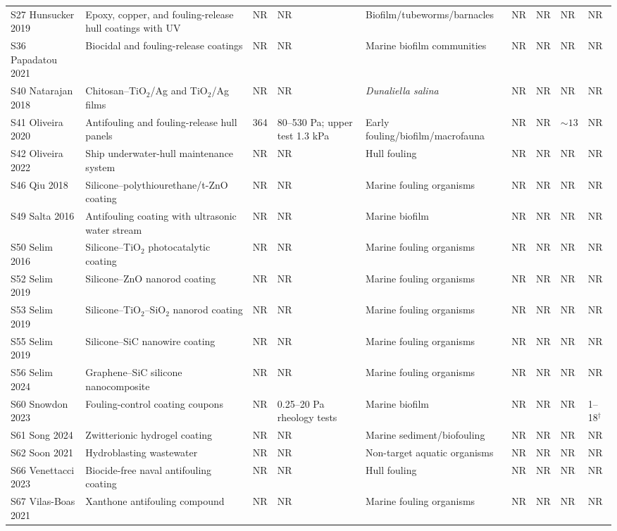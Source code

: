 \begin{table}[t]
{\begin{tabular}{l l l l l l l l l}
S27 Hunsucker 2019 & Epoxy, copper, and fouling-release hull coatings with UV & NR & NR & Biofilm/tubeworms/barnacles & NR & NR & NR & NR \\
S36 Papadatou 2021 & Biocidal and fouling-release coatings & NR & NR & Marine biofilm communities & NR & NR & NR & NR \\
S40 Natarajan 2018 & Chitosan--TiO$_2$/Ag and TiO$_2$/Ag films & NR & NR & \textit{Dunaliella salina} & NR & NR & NR & NR \\
S41 Oliveira 2020 & Antifouling and fouling-release hull panels & 364 & 80--530 Pa; upper test 1.3 kPa & Early fouling/biofilm/macrofauna & NR & NR & $\sim13$ & NR \\
S42 Oliveira 2022 & Ship underwater-hull maintenance system & NR & NR & Hull fouling & NR & NR & NR & NR \\
S46 Qiu 2018 & Silicone--polythiourethane/t-ZnO coating & NR & NR & Marine fouling organisms & NR & NR & NR & NR \\
S49 Salta 2016 & Antifouling coating with ultrasonic water stream & NR & NR & Marine biofilm & NR & NR & NR & NR \\
S50 Selim 2016 & Silicone--TiO$_2$ photocatalytic coating & NR & NR & Marine fouling organisms & NR & NR & NR & NR \\
S52 Selim 2019 & Silicone--ZnO nanorod coating & NR & NR & Marine fouling organisms & NR & NR & NR & NR \\
S53 Selim 2019 & Silicone--TiO$_2$--SiO$_2$ nanorod coating & NR & NR & Marine fouling organisms & NR & NR & NR & NR \\
S55 Selim 2019 & Silicone--SiC nanowire coating & NR & NR & Marine fouling organisms & NR & NR & NR & NR \\
S56 Selim 2024 & Graphene--SiC silicone nanocomposite & NR & NR & Marine fouling organisms & NR & NR & NR & NR \\
S60 Snowdon 2023 & Fouling-control coating coupons & NR & 0.25--20 Pa rheology tests & Marine biofilm & NR & NR & NR & 1--18$^\dagger$ \\
S61 Song 2024 & Zwitterionic hydrogel coating & NR & NR & Marine sediment/biofouling & NR & NR & NR & NR \\
S62 Soon 2021 & Hydroblasting wastewater & NR & NR & Non-target aquatic organisms & NR & NR & NR & NR \\
S66 Venettacci 2023 & Biocide-free naval antifouling coating & NR & NR & Hull fouling & NR & NR & NR & NR \\
S67 Vilas-Boas 2021 & Xanthone antifouling compound & NR & NR & Marine fouling organisms & NR & NR & NR & NR \\

\end{tabular}}
\end{table}
